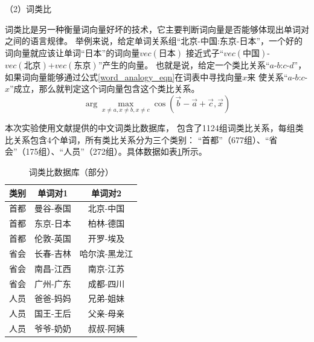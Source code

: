 （2）词类比

词类比是另一种衡量词向量好坏的技术，它主要判断词向量是否能够体现出单词对之间的语言规律。
举例来说，给定单词关系组“北京-中国:东京-日本”，一个好的词向量就应该让单词“日本”的词向量$vec\left(\mbox{日本}\right)$
接近式子“$vec\left(\mbox{中国}\right)$-$vec\left(\mbox{北京}\right)$+$vec\left(\mbox{东京}\right)$”产生的向量。
也就是说，给定一个类比关系“$a$-$b$:$c$-$d$”，如果词向量能够通过公式\ref{word_analogy_eqn}在词表中寻找向量$x$来
使关系“$a$-$b$:$c$-$x$”成立，那么就判定这个词向量包含这个类比关系。
\begin{equation}
    \arg \max_{x\neq a,x\neq b,x\neq c}\cos \left ( \vec{b}-\vec{a}+\vec{c},\vec{x} \right )
    \label{word_analogy_eqn}
\end{equation}

本次实验使用文献\cite{chen2015joint}提供的中文词类比数据库，
包含了1124组词类比关系，每组类比关系包含4个单词，所有类比关系分为三个类别：
“首都”（677组）、“省会”（175组）、“人员”（272组）。具体数据如表\ref{word_analogy_table}所示。
\begin{table}[ht]
    \caption{词类比数据库（部分）}
    \begin{tabular}{|c|c|c|}
        \hline
        类别 & 单词对1 & 单词对2 \\
        \hline
        首都 & 曼谷-泰国 & 北京-中国 \\
        \hline
        首都 & 东京-日本 & 柏林-德国 \\
        \hline
        首都 & 伦敦-英国 & 开罗-埃及 \\
        \hline
        省会 & 长春-吉林 & 哈尔滨-黑龙江 \\
        \hline
        省会 & 南昌-江西 & 南京-江苏 \\
        \hline
        省会 & 广州-广东 & 成都-四川 \\
        \hline
        人员 & 爸爸-妈妈 & 兄弟-姐妹 \\
        \hline
        人员 & 国王-王后 &  父亲-母亲\\
        \hline
        人员 & 爷爷-奶奶 & 叔叔-阿姨 \\
        \hline
    \end{tabular}
    \label{word_analogy_table}
    \end{table}

